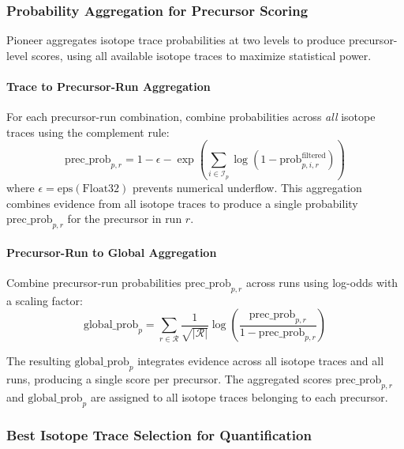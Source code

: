 \documentclass[pdflatex,sn-nature]{sn-jnl}
\begin{document}
\subsubsection{Probability Aggregation for Precursor Scoring}\label{subsubsec:probability-aggregation}

Pioneer aggregates isotope trace probabilities at two levels to produce precursor-level scores, using all available isotope traces to maximize statistical power. 

\paragraph{Trace to Precursor-Run Aggregation}\label{para:trace-to-precursor-run-aggregation} For each precursor-run combination, combine probabilities across \emph{all} isotope traces using the complement rule:
\begin{equation}
  \text{prec\_prob}_{p,r} = 1 - \epsilon - \exp\left(\sum_{i \in \mathcal{I}_p} \log(1 - \text{prob}_{p,i,r}^{\text{filtered}})\right)
\end{equation}
where $\epsilon = \text{eps}(\text{Float32})$ prevents numerical underflow. This aggregation combines evidence from all isotope traces to produce a single probability $\text{prec\_prob}_{p,r}$ for the precursor in run $r$.

\paragraph{Precursor-Run to Global Aggregation}\label{para:precursor-run-to-global-aggregation} Combine precursor-run probabilities $\text{prec\_prob}_{p,r}$ across runs using log-odds with a scaling factor:
\begin{equation}
  \text{global\_prob}_{p} = \sum_{r \in \mathcal{R}} \frac{1}{\sqrt{|\mathcal{R}|}} \log\left(\frac{\text{prec\_prob}_{p,r}}{1 - \text{prec\_prob}_{p,r}}\right)
\end{equation}

The resulting $\text{global\_prob}_p$ integrates evidence across all isotope traces and all runs, producing a single score per precursor. The aggregated scores $\text{prec\_prob}_{p,r}$ and $\text{global\_prob}_p$ are assigned to all isotope traces belonging to each precursor.

\subsubsection{Best Isotope Trace Selection for Quantification}\label{subsubsec:best-isotope-trace-selection}
\end{document}
